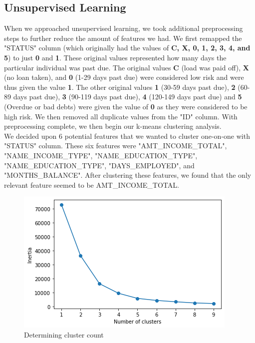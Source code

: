 \documentclass[12pt]{article}
\begin{document}
\subsection{Unsupervised Learning}

\noindent When we approached unsupervised learning, we took additional preprocessing steps to further reduce the amount of features we had. We first remapped the "STATUS" column (which originally had the values of \textbf{C, X, 0, 1, 2, 3, 4, and 5}) to just \textbf{0} and \textbf{1}. These original values represented how many days the particular individual was past due. The original values \textbf{C} (load was paid off), \textbf{X} (no loan taken), and \textbf{0} (1-29 days past due) were considered low risk and were thus given the value \textbf{1}. The other original values \textbf{1} (30-59 days past due), \textbf{2} (60-89 days past due), \textbf{3} (90-119 days past due), \textbf{4} (120-149 days past due) and \textbf{5} (Overdue or bad debts) were given the value of \textbf{0} as they were considered to be high risk. We then removed all duplicate values from the "ID" column. With preprocessing complete, we then begin our k-means clustering analysis.\\

\noindent We decided upon 6 potential features that we wanted to cluster one-on-one with "STATUS" column. These six features were "AMT\_INCOME\_TOTAL", "NAME\_INCOME\_TYPE", "NAME\_EDUCATION\_TYPE", 
"NAME\_EDUCATION\_TYPE", "DAYS\_EMPLOYED", and "MONTHS\_BALANCE". After clustering these features, we found that the only relevant feature seemed to be AMT\_INCOME\_TOTAL. \\

\begin{figure}
    \centering
    \includegraphics[scale = .6]{figures/output10.png} 
    \caption{Determining cluster count}
\end{figure}
\end{document}
